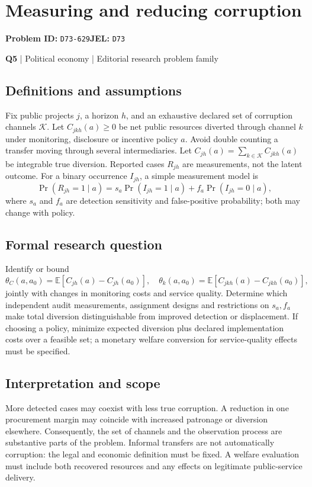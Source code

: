 \documentclass[11pt,a4paper]{article}
\begin{document}
\section*{Measuring and reducing corruption}
\textbf{Problem ID:} \texttt{D73-629}\quad \textbf{JEL:} \texttt{D73}\par
\label{problem:OP-0125}
\label{atlas:prob:Q5}
{\sffamily\small\color{muted}\textbf{Q5} | Political economy | Editorial research problem family\par}
\subsection*{Definitions and assumptions}
Fix public projects $j$, a horizon $h$, and an exhaustive declared set of corruption channels $\mathcal K$. Let $C_{jkh}(a)\geq0$ be net public resources diverted through channel $k$ under monitoring, disclosure or incentive policy $a$. Avoid double counting a transfer moving through several intermediaries. Let $C_{jh}(a)=\sum_{k\in\mathcal K}C_{jkh}(a)$ be integrable true diversion. Reported cases $R_{jh}$ are measurements, not the latent outcome. For a binary occurrence $I_{jh}$, a simple measurement model is
\[
\Pr(R_{jh}=1\mid a)=s_a\Pr(I_{jh}=1\mid a)+f_a\Pr(I_{jh}=0\mid a),
\]
where $s_a$ and $f_a$ are detection sensitivity and false-positive probability; both may change with policy.
\subsection*{Formal research question}
Identify or bound
\[
\theta_C(a,a_0)=\mathbb E[C_{jh}(a)-C_{jh}(a_0)],\quad
\theta_k(a,a_0)=\mathbb E[C_{jkh}(a)-C_{jkh}(a_0)],
\]
jointly with changes in monitoring costs and service quality. Determine which independent audit measurements, assignment designs and restrictions on $s_a,f_a$ make total diversion distinguishable from improved detection or displacement. If choosing a policy, minimize expected diversion plus declared implementation costs over a feasible set; a monetary welfare conversion for service-quality effects must be specified.
\subsection*{Interpretation and scope}
More detected cases may coexist with less true corruption. A reduction in one procurement margin may coincide with increased patronage or diversion elsewhere. Consequently, the set of channels and the observation process are substantive parts of the problem. Informal transfers are not automatically corruption: the legal and economic definition must be fixed. A welfare evaluation must include both recovered resources and any effects on legitimate public-service delivery.
\end{document}
